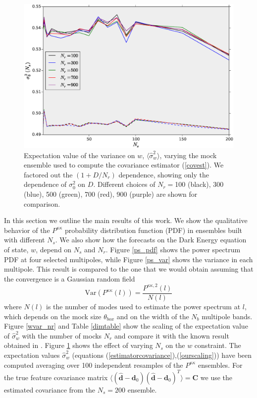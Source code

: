 \documentclass[reprint,aps,prd,superscriptaddress,showkeys,showpacs]{revtex4-1}
\newcommand{\bb}[1]{\mathbf{#1}}
\newcommand{\bbh}[1]{\mathbf{\hat{#1}}}
\newcommand{\h}[1]{\hat{#1}}
\begin{document}
\begin{figure}
\includegraphics[scale=0.3]{Figures/scaling_ns.eps}
\caption{Expectation value of the variance on $w$, $\langle\h{\sigma}^2_w\rangle$, varying the mock ensemble used to compute the covariance estimator (\ref{covest}). We factored out the $(1+D/N_r)$ dependence, showing only the dependence of $\sigma_0^2$ on $D$. Different choices of $N_r=$100 (black), 300 (blue), 500 (green), 700 (red), 900 (purple) are shown for comparison.}
\label{wvar_ns}
\end{figure}

In this section we outline the main results of this work. We show the qualitative behavior of the $P^{\kappa\kappa}$ probability distribution function (PDF) in ensembles built with different $N_s$. We also show how the forecasts on the Dark Energy equation of state, $w$, depend on $N_s$ and $N_r$. Figure \ref{ps_pdf} shows the power spectrum PDF at four selected multipoles, while Figure \ref{ps_var} shows the variance in each multipole. This result is compared to the one that we would obtain assuming that the convergence is a Gaussian random field
\begin{equation}
\label{gaussianvar}
\mathrm{Var}(P^{\kappa\kappa}(l)) = \frac{P^{\kappa\kappa,2}(l)}{N(l)}
\end{equation}
%
where $N(l)$ is the number of modes used to estimate the power spectrum at $l$, which depends on the mock size $\theta_{box}$ and on the width of the $N_b$ multipole bands. Figure \ref{wvar_nr} and Table \ref{dimtable} show the scaling of the expectation value of $\h{\sigma}_w^2$ with the number of mocks $N_r$ and compare it with the known result obtained in \citep{DodelsonSchneider13}. Figure \ref{wvar_ns} shows the effect of varying $N_s$ on the $w$ constraint. The expectation values $\h{\sigma}^2_w$ (equations (\ref{estimatorcovariance}),(\ref{ourscaling})) have been computed averaging over 100 independent resamples of the $P^{\kappa\kappa}$ ensembles. For the true feature covariance matrix $\langle(\bbh{d}-\bb{d}_0)(\bbh{d}-\bb{d}_0)^T\rangle=\bb{C}$ we use the estimated covariance from the $N_s=200$ ensemble. 
\end{document}
